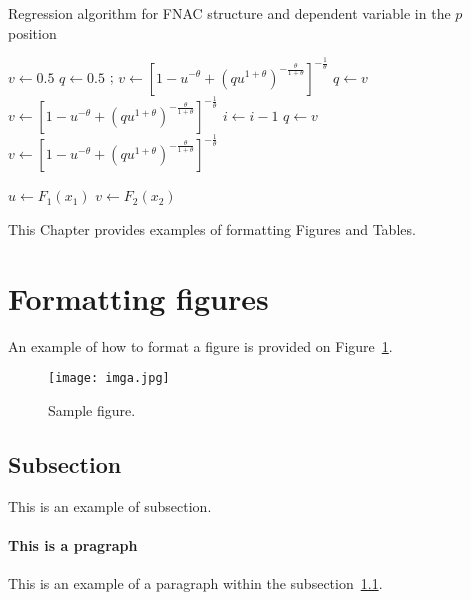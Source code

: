 \begin{algorithm} 
\caption{Regression algorithm for FNAC structure and dependent variable in the $p$ position}
\label{alg_2}
	\begin{algorithmic}[1]
		\State $v\gets 0.5$ 
		\State $q\gets 0.5$ 
 				;
 				\State $v\gets [1-u^{-\theta}+(qu^{1+\theta})^{-\frac{\theta}{1+\theta}}]^{-\frac{1}{\theta}}$ 
 		\Else
     		 
 				\State $q\gets v$ 
 				\State $v\gets [1-u^{-\theta}+(qu^{1+\theta})^{-\frac{\theta}{1+\theta}}]^{-\frac{1}{\theta}}$  
				\State $i\gets i-1$ 
			\EndFor {}
			\State $q\gets v$ 
 			\State $v\gets [1-u^{-\theta}+(qu^{1+\theta})^{-\frac{\theta}{1+\theta}}]^{-\frac{1}{\theta}}$  
\EndIf

\State $u\gets F_1(x_1)$ 
\State $v\gets F_2(x_2)$ 
		
	\end{algorithmic}
	\end{algorithm}


This Chapter provides examples of formatting Figures and Tables. 

\section{Formatting figures}
An example of how to format a  figure is provided on Figure~\ref{fig:example}.
\begin{figure}[!htb]
	\centering
	\texttt{[image: imga.jpg]}
	\caption{Sample figure.}
	\label{fig:example}
\end{figure}


\subsection{Subsection}
\label{sec:subsection}
This is an example of subsection.

\paragraph{This is a pragraph}
This is an example of a paragraph within the subsection~\ref{sec:subsection}.

